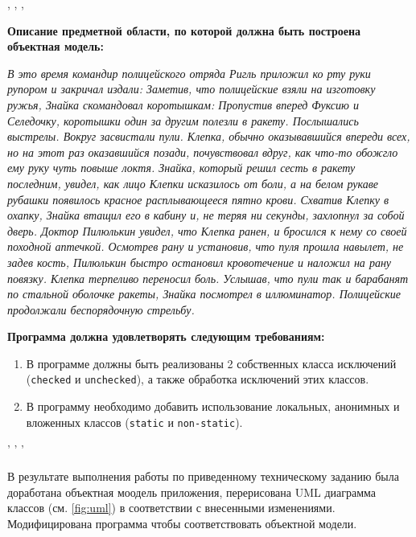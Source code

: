 \newpage
\Chapter{\lab\ \labnumber}{\labtheme}

\begin{center}
, , ,
\end{center}
\noindent
\textbf{
    Описание предметной области, по которой должна быть построена объектная модель:
}

\textit{
    В это время командир полицейского отряда Ригль приложил ко рту руки рупором и закричал издали: Заметив, что полицейские взяли на изготовку ружья, Знайка скомандовал коротышкам: Пропустив вперед Фуксию и Селедочку, коротышки один за другим полезли в ракету. Послышались выстрелы. Вокруг засвистали пули. Клепка, обычно оказывавшийся впереди всех, но на этот раз оказавшийся позади, почувствовал вдруг, как что-то обожгло ему руку чуть повыше локтя. Знайка, который решил сесть в ракету последним, увидел, как лицо Клепки исказилось от боли, а на белом рукаве рубашки появилось красное расплывающееся пятно крови. Схватив Клепку в охапку, Знайка втащил его в кабину и, не теряя ни секунды, захлопнул за собой дверь. Доктор Пилюлькин увидел, что Клепка ранен, и бросился к нему со своей походной аптечкой. Осмотрев рану и установив, что пуля прошла навылет, не задев кость, Пилюлькин быстро остановил кровотечение и наложил на рану повязку. Клепка терпеливо переносил боль. Услышав, что пули так и барабанят по стальной оболочке ракеты, Знайка посмотрел в иллюминатор. Полицейские продолжали беспорядочную стрельбу.\\
}

\noindent
\textbf{
    Программа должна удовлетворять следующим требованиям:
}
\begin{enumerate}
    \item В программе должны быть реализованы 2 собственных класса исключений (\texttt{checked} и \texttt{unchecked}), а также обработка исключений этих классов.
    \item В программу необходимо добавить использование локальных, анонимных и вложенных классов (\texttt{static} и \texttt{non-static}).
\end{enumerate}
\begin{center}
    ' ' '
\end{center}

\newpage
{}
В результате выполнения работы по приведенному техническому заданию была доработана объектная моодель приложения, перерисована UML диаграмма классов (см. \ref{fig:uml}) в соответствии с внесенными изменениями. Модифицирована программа чтобы соответствовать объектной модели. 

